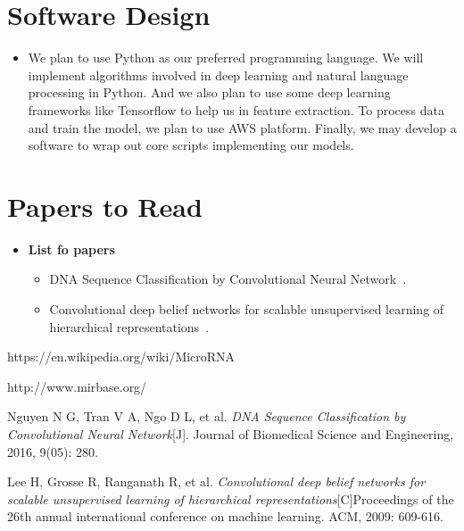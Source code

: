 \documentclass[letterpaper, 11pt]{article}
\begin{document}
\section{Software Design}
\begin{itemize}
\item
We plan to use Python as our preferred programming language. We will implement algorithms involved in deep learning and natural language processing in Python. And we also plan to use some deep learning frameworks like Tensorflow to help us in feature extraction. To process data and train the model, we plan to use AWS platform. Finally, we may develop a software to wrap out core scripts implementing our models.
\end{itemize}


\section{Papers to Read}
\begin{itemize}
\item
	\textbf{List fo papers}
	
	\begin{itemize}
	\item
		DNA Sequence Classification by Convolutional Neural Network~\cite{NLP}.
		
	\item
		Convolutional deep belief networks for scalable unsupervised learning of hierarchical representations~\cite{CNN}.
	\end{itemize}
\end{itemize}


\begin{thebibliography}{1}
\textit{}https://en.wikipedia.org/wiki/MicroRNA

\textit{}http://www.mirbase.org/

Nguyen N G, Tran V A, Ngo D L, et al. \textit{DNA Sequence Classification by Convolutional Neural Network}[J]. Journal of Biomedical Science and Engineering, 2016, 9(05): 280.

Lee H, Grosse R, Ranganath R, et al. \textit{Convolutional deep belief networks for scalable unsupervised learning of hierarchical representations}[C]Proceedings of the 26th annual international conference on machine learning. ACM, 2009: 609-616.
\end{thebibliography}
\end{document}
